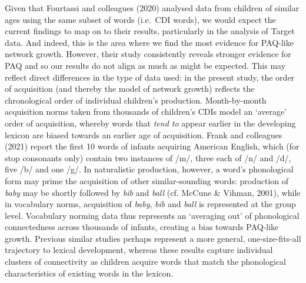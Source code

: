 \documentclass[
  man]{apa6}
\begin{document}
Given that Fourtassi and colleagues (2020) analysed data from children of similar ages using the same subset of words (i.e.~CDI words), we would expect the current findings to map on to their results, particularly in the analysis of Target data. And indeed, this is the area where we find the most evidence for PAQ-like network growth. However, their study consistently reveals stronger evidence for PAQ and so our results do not align as much as might be expected. This may reflect direct differences in the type of data used: in the present study, the order of acquisition (and thereby the model of network growth) reflects the chronological order of individual children's production. Month-by-month acquisition norms taken from thousands of children's CDIs model an `average' order of acquisition, whereby words that \emph{tend to} appear earlier in the developing lexicon are biased towards an earlier age of acquisition. Frank and colleagues (2021) report the first 10 words of infants acquiring American English, which (for stop consonants only) contain two instances of /m/, three each of /n/ and /d/, five /b/ and one /g/. In naturalistic production, however, a word's phonological form may prime the acquisition of other similar-sounding words: production of \emph{baby} may be shortly followed by \emph{bib} and \emph{ball} (cf. McCune \& Vihman, 2001), while in vocabulary norms, acquisition of \emph{baby}, \emph{bib} and \emph{ball} is represented at the group level. Vocabulary norming data thus represents an `averaging out' of phonological connectedness across thousands of infants, creating a bias towards PAQ-like growth. Previous similar studies perhaps represent a more general, one-size-fits-all trajectory to lexical development, whereas these results capture individual clusters of connectivity as children acquire words that match the phonological characteristics of existing words in the lexicon.
\end{document}
